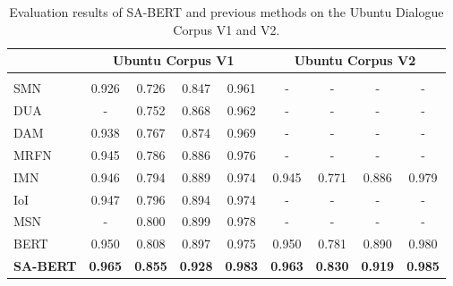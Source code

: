 \documentclass[sigconf]{acmart}
\begin{document}
    \begin{table*}[!hbt]
\caption{Evaluation results of SA-BERT and previous methods on the Ubuntu Dialogue Corpus V1 and V2.}
      \centering
      \begin{tabular}{l|c|c|c|c|c|c|c|c}
      \toprule
                             & \multicolumn{4}{c|}{Ubuntu Corpus V1} & \multicolumn{4}{c}{Ubuntu Corpus V2} \\
      \hline
                             &  &  &  &  &  &  &  & \\
\hline
       SMN  \cite{DBLP:conf/acl/WuWXZL17}                 & 0.926 & 0.726 & 0.847 & 0.961 & -     & -     & -     & -     \\
       DUA  \cite{DBLP:conf/coling/ZhangLZZL18}           & -     & 0.752 & 0.868 & 0.962 & -     & -     & -     & -     \\
       DAM  \cite{DBLP:conf/acl/WuLCZDYZL18}              & 0.938 & 0.767 & 0.874 & 0.969 & -     & -     & -     & -     \\
       MRFN \cite{DBLP:conf/wsdm/TaoWXHZY19}              & 0.945 & 0.786 & 0.886 & 0.976 & -     & -     & -     & -     \\
       IMN  \cite{DBLP:conf/cikm/GuLL19}                  & 0.946 & 0.794 & 0.889 & 0.974 & 0.945 & 0.771 & 0.886 & 0.979 \\
       IoI  \cite{DBLP:conf/acl/TaoWXHZY19}               & 0.947 & 0.796 & 0.894 & 0.974 & -     & -     & -     & -     \\
       MSN  \cite{DBLP:conf/emnlp/YuanZLLZHH19}           & -     & 0.800 & 0.899 & 0.978 & -     & -     & -     & -     \\
      \hline
       BERT                                               & 0.950 & 0.808 & 0.897 & 0.975 & 0.950 & 0.781 & 0.890 & 0.980 \\
       \textbf{SA-BERT}                                   & \textbf{0.965} & \textbf{0.855} & \textbf{0.928} & \textbf{0.983} & \textbf{0.963} & \textbf{0.830} & \textbf{0.919} & \textbf{0.985}  \\   			
      \bottomrule
      \end{tabular}
      \label{tab2}
    \end{table*}
\end{document}
